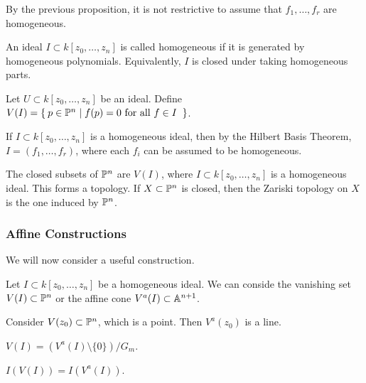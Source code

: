 \documentclass[twoside, 10pt]{article}
\begin{document}
    By the previous proposition, it is not restrictive to assume that $f_1,
    \ldots, f_r$ are homogeneous.

    \begin{defn} An ideal $I \subset k[z_0, \ldots, z_n]$ is
    called homogeneous if it is generated by homogeneous polynomials.
Equivalently, $I$ is closed under taking homogeneous parts.  \end{defn}

    \begin{defn} Let $U \subset k[z_0, \ldots, z_n]$ be
    an ideal. Define $V(I) = \Set{p \in \P^n | f(p) = 0 \text{ for all $f \in
I$ }}$.  \end{defn}

    \begin{rmk} If $I \subset k[z_0, \ldots, z_n]$ is a homogeneous ideal, then
    by the Hilbert Basis Theorem, $I = (f_1, \ldots, f_r)$, where each $f_i$
can be assumed to be homogeneous.  \end{rmk}

    \begin{defn} The closed subsets of $\P^n$ are
        $V(I)$, where $I \subset k[z_0, \ldots, z_n]$ is a homogeneous ideal.
        This forms a topology. If $X \subset \P^n$ is closed, then the Zariski
        topology on $X$ is the one induced by $\P^n$.  \end{defn}

    \subsubsection{Affine Constructions}

    We will now consider a useful construction.  \begin{defn} Let
    $I \subset k[z_0, \ldots, z_n]$ be a homogeneous ideal. We can conside the
vanishing set $V(I) \subset \P^n$ or the affine cone $V^a(I) \subset \A^{n+1}$.
\end{defn}

    \begin{exm} Consider $V(z_0) \subset \P^n$, which is a point. Then
    $V^a(z_0)$ is a line.  \end{exm}

    \begin{rmk} $V(I) = (V^a(I) \setminus \{0\}) / G_m$.  \end{rmk}

    \begin{rmk} $I(V(I)) = I(V^a(I))$.  \end{rmk}
\end{document}
